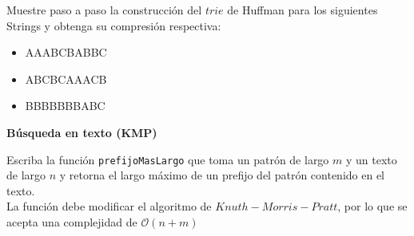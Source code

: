 \documentclass[dcc,uchile]{fcfmcourse}
\begin{document}
\begin{problems}
Muestre paso a paso la construcción del $trie$ de Huffman para los siguientes Strings y obtenga su compresión respectiva:
\begin{itemize}
    \item AAABCBABBC
    \item ABCBCAAACB
    \item BBBBBBBABC
\end{itemize}

\problem \textbf{Búsqueda en texto (KMP)}

Escriba la función \texttt{prefijoMasLargo} que toma un patrón de largo $m$ y un texto de largo $n$ y retorna el largo máximo de un prefijo del patrón contenido en el texto.\\
La función debe modificar el algoritmo de $Knuth-Morris-Pratt$, por lo que se acepta una complejidad de $\mathcal{O}(n+m)$

\end{problems}
\end{document}
